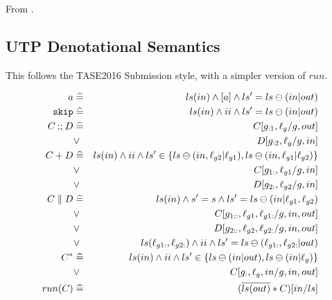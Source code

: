\def\arr#1{\stackrel{#1}{\fun}}
\def\arrs{\fun^*}
From \cite{conf/popl/Dinsdale-YoungBGPY13}.





\subsection{UTP Denotational Semantics}

This follows the TASE2016 Submission style,
with a simpler version of $run$.

\begin{eqnarray*}
   a
   &\mathrel{\widehat=}&
   ls(in) \land [a] \land ls'=ls \ominus (in|out)
\\ \texttt{skip}
   &\mathrel{\widehat=}&
   ls(in) \land ii \land ls'=ls \ominus (in|out)
\\ C \mathbin{;\!;} D
   &\mathrel{\widehat=}&
   C[g_{:1},\ell_g/g,out]
\\ &\lor&
   D[g_{:2},\ell_g/g,in]
\\ C + D
   &\mathrel{\widehat=}&
   ls(in)
   \land ii
   \land ls' \in \{ ls \ominus (in,\ell_{g2}|\ell_{g1})
                  , ls \ominus (in,\ell_{g1}|\ell_{g2})\}
\\ &\lor&
   C[g_{1:},\ell_{g1}/g,in]
\\ &\lor&
   D[g_{2:},\ell_{g2}/g,in]
\\ C \parallel D
   &\mathrel{\widehat=}&
   ls(in)
   \land s' = s
   \land ls'= ls \ominus (in|\ell_{g1},\ell_{g2})
\\ &\lor&
   C[g_{1::},\ell_{g1},\ell_{g1:}/g,in,out]
\\ &\lor&
   D[g_{2::},\ell_{g2},\ell_{g2:}/g,in,out]
\\ &\lor&
   ls(\ell_{g1:},\ell_{g2:})
   \land ii
   \land ls'= ls \ominus (\ell_{g1:},\ell_{g2:}|out)
\\ C^*
   &\mathrel{\widehat=}&
   ls(in)
   \land ii
   \land ls' \in \{ ls \ominus (in|out), ls \ominus (in|\ell_g)\}
\\ &\lor&
   C[g_{:},\ell_g,in/g,in,out]
\\ run(C)
   &\mathrel{\widehat=}&
   ( \overline{ls(out)} * C)[in/ls]
\end{eqnarray*}

